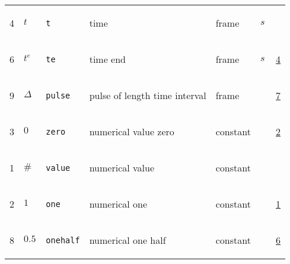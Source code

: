 \begin{longtable}{|p{1cm}|p{2.5cm}|p{4.5cm}|p{8cm}|p{3.0cm}|p{3cm}|p{1cm}|}
                 \\
            4
             & \hypertarget{"v:4"}{ $ {t}{_{}} $}
             & \verb|t|
             & time
             & \begin{lay}frame \end{lay}
             & $ s \, $
             & \\
            6
             & \hypertarget{"v:6"}{ $ {{t^e}}{_{}} $}
             & \verb|te|
             & time end
             & \begin{lay}frame \end{lay}
             & $ s \, $
             &                 \hyperlink{"e:4"}{ 4 }
                 \\
            9
             & \hypertarget{"v:9"}{ $ {{\Delta}}{_{}} $}
             & \verb|pulse|
             & pulse of length time interval
             & \begin{lay}frame \end{lay}
             & $  $
             &                 \hyperlink{"e:7"}{ 7 }
                 \\
            3
             & \hypertarget{"v:3"}{ $ {0}{_{}} $}
             & \verb|zero|
             & numerical value zero
             & \begin{lay}constant \end{lay}
             & $  $
             &                 \hyperlink{"e:2"}{ 2 }
                 \\
            1
             & \hypertarget{"v:1"}{ $ {{\#}}{_{}} $}
             & \verb|value|
             & numerical value
             & \begin{lay}constant \end{lay}
             & $  $
             & \\
            2
             & \hypertarget{"v:2"}{ $ {1}{_{}} $}
             & \verb|one|
             & numerical one
             & \begin{lay}constant \end{lay}
             & $  $
             &                 \hyperlink{"e:1"}{ 1 }
                 \\
            8
             & \hypertarget{"v:8"}{ $ {0.5}{_{}} $}
             & \verb|onehalf|
             & numerical one half
             & \begin{lay}constant \end{lay}
             & $  $
             &                 \hyperlink{"e:6"}{ 6 }
                 \\
    \end{longtable}